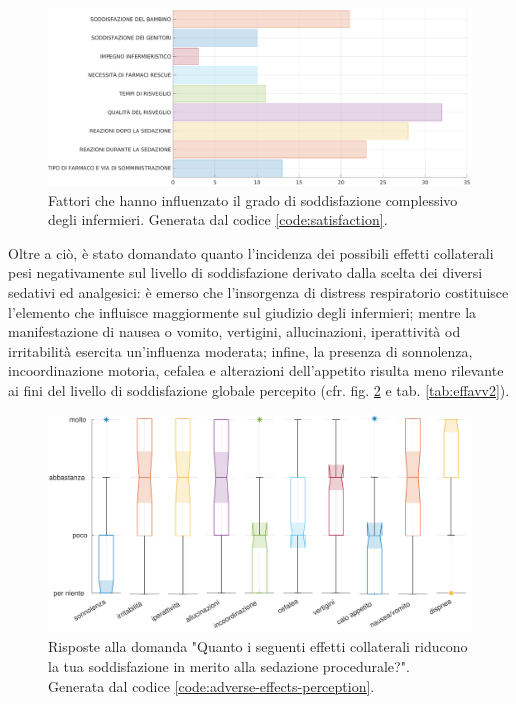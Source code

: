 \begin{figure}[!h]
    \centering
    \includegraphics[width=1\textwidth]{Figure/soddisfazione-globale.eps}
    \caption{Fattori che hanno influenzato il grado di soddisfazione complessivo degli infermieri. Generata dal codice \ref{code:satisfaction}.}
    \label{fig:soddglobale}
\end{figure}

\newpage
Oltre a ciò, è stato domandato quanto l'incidenza dei possibili effetti collaterali pesi negativamente sul livello di soddisfazione derivato dalla scelta dei diversi sedativi ed analgesici: è emerso che l'insorgenza di distress respiratorio costituisce l'elemento che influisce maggiormente sul giudizio degli infermieri; mentre la manifestazione di nausea o vomito, vertigini, allucinazioni, iperattività od irritabilità esercita un'influenza moderata; infine, la presenza di sonnolenza, incoordinazione motoria, cefalea e alterazioni dell'appetito risulta meno rilevante ai fini del livello di soddisfazione globale percepito (cfr. fig. \ref{fig:influenzaeffetti} e tab. \ref{tab:effavv2}). 

\vfill

\begin{figure}[!ht]
    \centering
    \includegraphics[width=1\textwidth]{Figure/influenza-effetti.pdf}
    \caption{Risposte alla domanda "Quanto i seguenti effetti collaterali riducono la tua soddisfazione in merito alla sedazione procedurale?".\\ Generata dal codice \ref{code:adverse-effects-perception}.}
    \label{fig:influenzaeffetti}
\end{figure}

